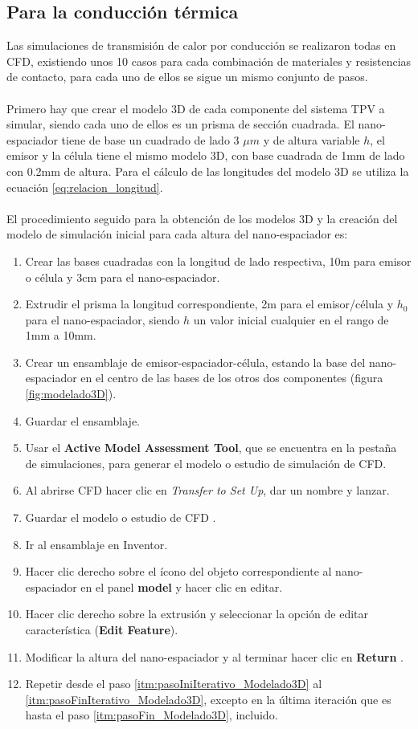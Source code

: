\subsection{Para la conducción térmica}
Las simulaciones de transmisión de calor por conducción se realizaron todas en CFD, existiendo unos 10 casos para cada combinación de materiales y resistencias de contacto, para cada uno de ellos se sigue un mismo conjunto de pasos. \\\\
Primero hay que crear el modelo 3D de cada componente del sistema TPV a simular, siendo cada uno de ellos es un prisma de sección cuadrada. El nano-espaciador tiene de base un cuadrado de lado 3 $\mu m$ y de altura variable $h$, el emisor y la célula tiene el mismo modelo 3D, con base cuadrada de 1mm de lado con 0.2mm de altura. Para el cálculo de las longitudes del modelo 3D se utiliza la ecuación \ref{eq:relacion_longitud}.\\\\
El procedimiento seguido para la obtención de los modelos 3D y la creación del modelo de simulación inicial para cada altura del nano-espaciador es:
\begin{enumerate}
	\item Crear las bases cuadradas con la longitud de lado respectiva, 10m para emisor o célula y 3cm para el nano-espaciador. 
	\item Extrudir el prisma la longitud correspondiente, 2m para el emisor/célula y $h_0$ para el nano-espaciador, siendo $h$ un valor inicial cualquier en el rango de 1mm a 10mm.
	\item Crear un ensamblaje de emisor-espaciador-célula, estando la base del nano-espaciador en el centro de las bases de los otros dos componentes (figura \ref{fig:modelado3D}).
	\item Guardar el ensamblaje.
	\item Usar el \textbf{Active Model Assessment Tool}, que se encuentra en la pestaña de simulaciones, para generar el modelo o estudio de simulación de CFD\label{itm:pasoIniIterativo_Modelado3D}.
	\item Al abrirse CFD hacer clic en \textit{Transfer to Set Up}, dar un nombre y lanzar.
	\item Guardar el modelo o estudio de CFD \label{itm:pasoFin_Modelado3D}.
	\item Ir al ensamblaje en Inventor.
	\item Hacer clic derecho sobre el ícono del objeto correspondiente al nano-espaciador en el panel \textbf{model} y hacer clic en editar.
	\item Hacer clic derecho sobre la extrusión y seleccionar la opción de editar característica (\textbf{Edit Feature}).
	\item Modificar la altura del nano-espaciador y al terminar hacer clic en \textbf{Return} \label{itm:pasoFinIterativo_Modelado3D}.
	\item Repetir desde el paso \ref{itm:pasoIniIterativo_Modelado3D} al \ref{itm:pasoFinIterativo_Modelado3D}, excepto en la última iteración que es hasta el paso \ref{itm:pasoFin_Modelado3D}, incluido.
\end{enumerate}
